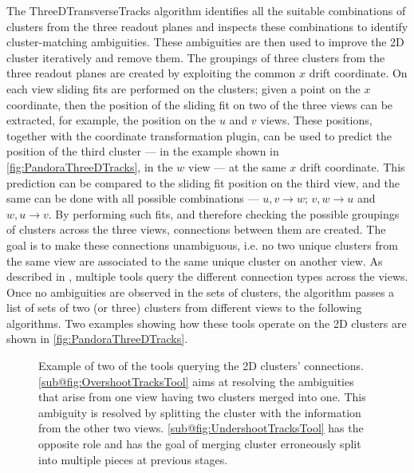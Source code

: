 The ThreeDTransverseTracks algorithm identifies all the suitable combinations of clusters from the three readout planes and inspects these combinations to identify cluster-matching ambiguities. These ambiguities are then used to improve the 2D cluster iteratively and remove them. The groupings of three clusters from the three readout planes are created by exploiting the common $x$ drift coordinate. On each view sliding fits are performed on the clusters; given a point on the $x$ coordinate, then the position of the sliding fit on two of the three views can be extracted, for example, the position on the $u$ and $v$ views. These positions, together with the coordinate transformation plugin, can be used to predict the position of the third cluster --- in the example shown in \autoref{fig:PandoraThreeDTracks}, in the $w$ view --- at the same $x$ drift coordinate. This prediction can be compared to the sliding fit position on the third view, and the same can be done with all possible combinations --- $u,v\to w$; $v,w\to u$ and $w, u \to v$. By performing such fits, and therefore checking the possible groupings of clusters across the three views, connections between them are created. The goal is to make these connections unambiguous, i.e. no two unique clusters from the same view are associated to the same unique cluster on another view. As described in \cite{MicroBooNE:2017xvs}, multiple tools query the different connection types across the views. Once no ambiguities are observed in the sets of clusters, the algorithm passes a list of sets of two (or three) clusters from different views to the following algorithms. Two examples showing how these tools operate on the 2D clusters are shown in \autoref{fig:PandoraThreeDTracks}. 

\begin{figure}
    \centering
    \caption[Three-dimensional reconstruction helper tools]{Example of two of the tools querying the 2D clusters' connections. \ref{sub@fig:OvershootTracksTool} aims at resolving the ambiguities that arise from one view having two clusters merged into one. This ambiguity is resolved by splitting the cluster with the information from the other two views. \ref{sub@fig:UndershootTracksTool} has the opposite role and has the goal of merging cluster erroneously split into multiple pieces at previous stages. }
    \label{fig:PandoraThreeDTracks}
\end{figure}

